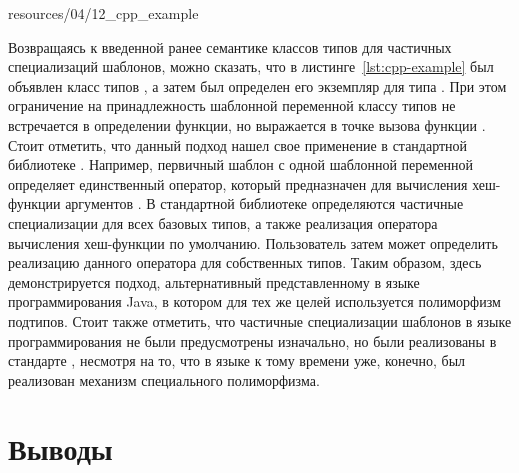  
{resources/04/12_cpp_example}

Возвращаясь к введенной ранее семантике классов типов для частичных специализаций шаблонов, можно сказать, что в листинге~\ref{lst:cpp-example} был объявлен класс типов , а затем был определен его экземпляр для типа . При этом ограничение на принадлежность шаблонной переменной классу типов не встречается в определении функции, но выражается в точке вызова функции . Стоит отметить, что данный подход нашел свое применение в стандартной библиотеке \cpp. Например, первичный шаблон  с одной шаблонной переменной  определяет единственный оператор, который предназначен для вычисления хеш-функции аргументов . В стандартной библиотеке определяются частичные специализации  для всех базовых типов, а также реализация оператора вычисления хеш-функции по умолчанию. Пользователь затем может определить реализацию данного оператора для собственных типов. Таким образом, здесь демонстрируется подход, альтернативный представленному в языке программирования Java, в котором для тех же целей используется полиморфизм подтипов. Стоит также отметить, что частичные специализации шаблонов в языке программирования \cpp не были предусмотрены изначально, но были реализованы в стандарте , несмотря на то, что в языке \cpp к тому времени уже, конечно, был реализован механизм специального полиморфизма.  

\section{Выводы \label{sct:overview-conclusion}}

